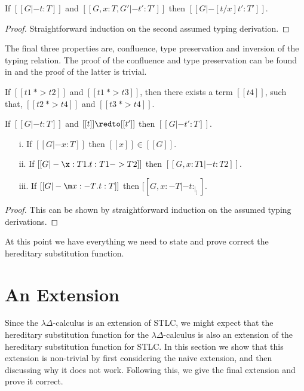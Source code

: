 \begin{lemma}
  \label{lemma:substitution_for_typing}
  If $[[G |- t : T]]$ and $[[G,x:T,G' |- t':T']]$ then $[[G |- [t/x]t':T']]$.
\end{lemma}
\begin{proof}
  Straightforward induction on the second assumed typing derivation.
\end{proof}
\noindent
The final three properties are, confluence, type preservation and inversion of the typing
relation. The proof of the confluence and type preservation can be found in \cite{Rehof:1994}
and the proof of the latter is trivial.

\begin{thm}[Confluence]
  \label{thm:confluence}
  If $[[t1 ~*> t2]]$ and $[[t1 ~*> t3]]$, then there exists a term $[[t4]]$, such that,
  $[[t2 ~*> t4]]$ and $[[t3 ~*> t4]]$.
\end{thm}

\begin{thm}[Preservation]
  \label{thm:preservation}
  If $[[G |- t : T]]$ and $[[t]] \redto [[t']]$ then $[[G |- t' : T]]$.
\end{thm}

\begin{thm}[Inversion]
  \label{theorem:inversion}
  \begin{itemize}
  \item[i.] If $[[G |- x : T]]$ then $[[x]] \in [[G]]$.
  \item[ii.] If $[[G |- \x:T1.t:T1->T2]]$ then $[[G, x:T1 |- t:T2]]$.
  \item[iii.] If $[[G |- \m x:{-T}.t:T]]$ then $[[G, x:{-T} |- t: _|_]]$.
  \end{itemize}
\end{thm}
\begin{proof}
  This can be shown by straightforward induction on the assumed typing derivations.
\end{proof}
\noindent
At this point we have everything we need to state and prove correct
the hereditary substitution function.

\section{An Extension}
\label{sec:the_hereditary_substitution_function_for_the_ld-calculus}
Since the $\lambda\Delta$-calculus is an extension of
STLC, we might expect that 
the hereditary substitution function for the $\lambda\Delta$-calculus is also an extension of the
hereditary substitution function for STLC.  In this section we show that this extension is
non-trivial by first considering the naive extension, and then discussing why it does not work.
Following this, we give the final extension and prove it correct.

